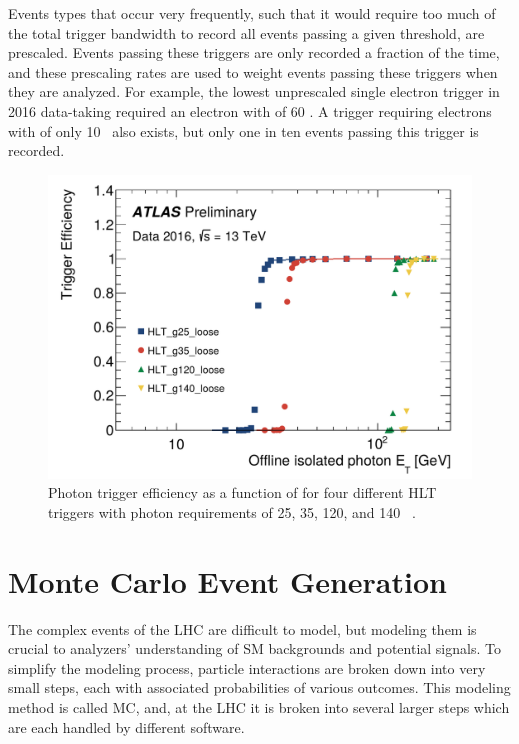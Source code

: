 Events types that occur very frequently, such that it would require too much of the total trigger bandwidth to record all events passing a given threshold, are prescaled. Events passing these triggers are only recorded a fraction of the time, and these prescaling rates are used to weight events passing these triggers when they are analyzed. For example, the lowest unprescaled single electron trigger in 2016 data-taking required an electron with \pt of 60 \gev. A trigger requiring electrons with \pt of only 10 \gev~also exists, but only one in ten events passing this trigger is recorded. 

\begin{centering}
\begin{figure}[!hbt]
\myfloatalign
\includegraphics[width=.90\linewidth]{figures/atlas/plot_Combined_Pt_LOGaxis_Et_log_25l_35l_120l_140l.pdf}
\caption{Photon trigger efficiency as a function of \et for four different \ac{HLT} triggers with photon \pt requirements of 25, 35, 120, and 140 \gev~\cite{egamma_trig}.}
\label{fig:trig_el_eff}
\end{figure}
\end{centering}


\section{Monte Carlo Event Generation}
\label{sec:MC_gen}

The complex events of the \ac{LHC} are difficult to model, but modeling them is crucial to analyzers' understanding of \ac{SM} backgrounds and potential signals. To simplify the modeling process, particle interactions are broken down into very small steps, each with associated probabilities of various outcomes. This modeling method is called \acf{MC}, and, at the \ac{LHC} it is broken into several larger steps which are each handled by different software. 

